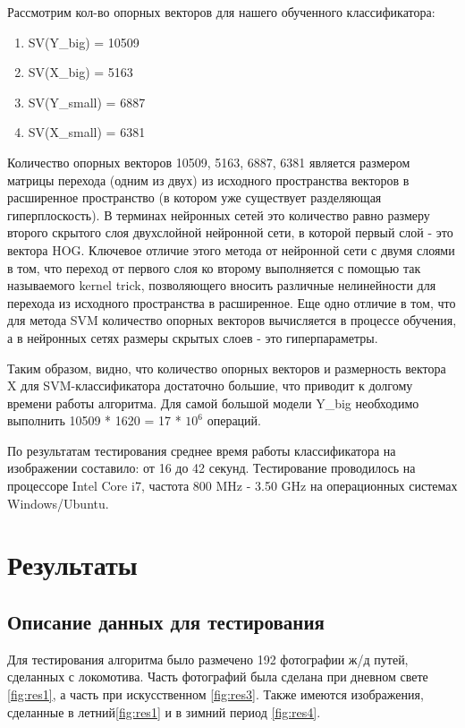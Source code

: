 Рассмотрим кол-во опорных векторов для нашего обученного классификатора:
\begin{enumerate}
	\item SV(Y\_big) = 10509
	\item SV(X\_big) = 5163
	\item SV(Y\_small) = 6887
	\item SV(X\_small) = 6381
\end{enumerate}

Количество опорных векторов 10509, 5163, 6887, 6381 является размером матрицы перехода (одним из двух) из исходного пространства векторов в расширенное пространство (в котором уже существует разделяющая гиперплоскость). В терминах нейронных сетей это количество равно размеру второго скрытого слоя двухслойной нейронной сети, в которой первый слой - это вектора HOG. Ключевое отличие этого метода от нейронной сети с двумя слоями в том, что переход от первого слоя ко второму выполняется с помощью так называемого kernel trick, позволяющего вносить различные нелинейности для перехода из исходного пространства в расширенное. Еще одно отличие в том, что для метода SVM  количество опорных векторов вычисляется в процессе обучения, а в нейронных сетях размеры скрытых слоев - это гиперпараметры.

Таким образом, видно, что количество опорных векторов и размерность вектора X для SVM-классификатора достаточно большие, что приводит к долгому времени работы алгоритма.
Для самой большой модели Y\_big необходимо выполнить 10509 * 1620 = 17 * $10^6$ операций.

По результатам тестирования среднее время работы классификатора на изображении составило: от 16 до 42 секунд. Тестирование проводилось на процессоре Intel Core i7, частота 800 MHz - 3.50 GHz на операционных системах Windows/Ubuntu.

\newpage
\chapter{Результаты}

\section{Описание данных для тестирования}
Для тестирования алгоритма было размечено 192 фотографии ж/д путей, сделанных с локомотива. Часть фотографий была сделана при дневном свете \ref{fig:res1}, а часть при искусственном \ref{fig:res3}. Также имеются изображения, сделанные в летний\ref{fig:res1} и в зимний период \ref{fig:res4}.

